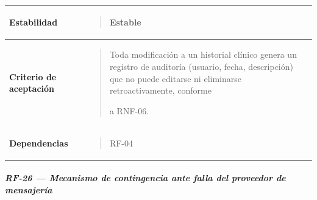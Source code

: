 \documentclass[
]{article}
\newcounter{none} %
\begin{document}
{\def\LTcaptype{none} %
\begin{longtable}[]{@{}
  >{\raggedright\arraybackslash}p{}
  >{\raggedright\arraybackslash}p{}@{}}
\toprule\noalign{}
\begin{minipage}[b]{\linewidth}\raggedright
\textbf{Estabilidad}
\end{minipage} & \begin{minipage}[b]{\linewidth}\raggedright
\begin{quote}
Estable
\end{quote}
\end{minipage} \\
\midrule\noalign{}
\endhead
\bottomrule\noalign{}
\endlastfoot
\textbf{Criterio de aceptación} &
\begin{minipage}[t]{\linewidth}\raggedright
\begin{quote}
Toda modificación a un historial clínico genera un registro de auditoría
(usuario, fecha, descripción) que no puede editarse ni eliminarse
retroactivamente, conforme

a RNF-06.
\end{quote}
\end{minipage} \\
\textbf{Dependencias} & \begin{minipage}[t]{\linewidth}\raggedright
\begin{quote}
RF-04
\end{quote}
\end{minipage} \\
\end{longtable}
}

\subparagraph{RF-26 --- Mecanismo de contingencia ante falla del
proveedor de mensajería}\label{rf-26-mecanismo-de-contingencia-ante-falla-del-proveedor-de-mensajerueda}
\end{document}
